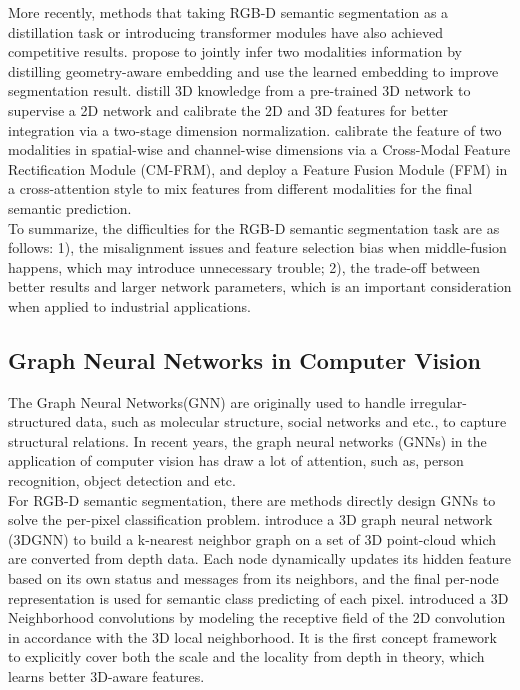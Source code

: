 ﻿\documentclass[journal]{IEEEtran}
\begin{document}
    More recently, methods that taking RGB-D semantic segmentation as a distillation task or introducing transformer modules have also achieved competitive results. \cite{jiao2019geometrydistillation} propose to  jointly infer two modalities information by distilling geometry-aware embedding and use the learned embedding to improve segmentation result. \cite{liu2021distillation} distill 3D knowledge from a pre-trained 3D network to supervise a 2D network and calibrate the 2D and 3D features for better integration via a two-stage dimension normalization. \cite{liu2022cmx} calibrate the feature of two modalities in spatial-wise and channel-wise dimensions via a Cross-Modal Feature Rectification Module (CM-FRM), and deploy a Feature Fusion Module (FFM) in a cross-attention style to mix features from different modalities for the final semantic prediction. \\   
  
    To summarize, the difficulties for the RGB-D semantic segmentation task are as follows: 1), the misalignment issues and feature selection bias when middle-fusion happens, which may introduce unnecessary trouble; 2), the trade-off between better results and larger network parameters, which is an important consideration when applied to industrial applications.  \\   

\subsection{Graph Neural Networks in Computer Vision}  
 
    The Graph Neural Networks(GNN) are originally used to handle irregular-structured data, such as molecular structure, social networks and etc., to capture structural relations. In recent years, the graph neural networks (GNNs) in the application of computer vision has draw a lot of attention, such as, person recognition\cite{yao2022sparse}, object detection\cite{zhao2021graphfpn}\cite{shi2020point}\cite{zhang2021pc} and etc.  \\   
 
   
    For RGB-D semantic segmentation, there are methods directly design GNNs to solve the per-pixel classification problem. \cite{qi20173d} introduce a 3D graph neural network (3DGNN) to build a k-nearest neighbor graph on a set of 3D point-cloud which are converted from depth data. Each node dynamically updates its hidden feature based on its own status and messages from its neighbors, and the final per-node representation is used for semantic class predicting of each pixel.  \cite{chen20193dneighbor}introduced a 3D Neighborhood convolutions by modeling the receptive field of the 2D convolution in accordance with the 3D local neighborhood. It is the first concept framework to explicitly cover both the scale and the locality from depth in theory, which learns better 3D-aware features.\\   
    
\end{document}
